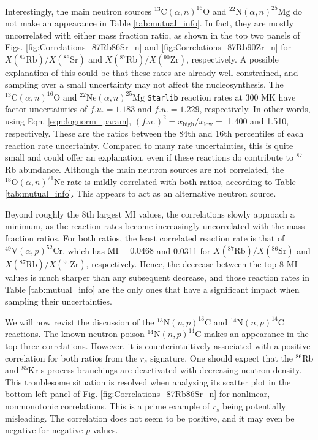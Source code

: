 Interestingly, the main neutron sources $^{13}\mathrm{C}(\alpha,n)^{16}\mathrm{O}$ and $^{22}\mathrm{N}(\alpha,n)^{25}\mathrm{Mg}$ do not make an appearance in Table \ref{tab:mutual_info}. In fact, they are mostly uncorrelated with either mass fraction ratio, as shown in the top two panels of Figs. \ref{fig:Correlations_87Rb86Sr_n} and \ref{fig:Correlations_87Rb90Zr_n} for $X(^{87}\mathrm{Rb})/X(^{86}\mathrm{Sr})$ and $X(^{87}\mathrm{Rb})/X(^{90}\mathrm{Zr})$, respectively. A possible explanation of this could be that these rates are already well-constrained, and sampling over a small uncertainty may not affect the nucleosynthesis. The $^{13}\mathrm{C}(\alpha,n)^{16}\mathrm{O}$ and $^{22}\mathrm{Ne}(\alpha,n)^{25}\mathrm{Mg}$ \texttt{Starlib} reaction rates at 300 MK have factor uncertainties of $f.u. = 1.183$ and $f.u. = 1.229$, respectively. In other words, using Eqn. \ref{eqn:lognorm_param}, $(f.u.)^{2} = x_{\mathrm{high}}/x_{\mathrm{low}} =$ 1.400 and 1.510, respectively. These are the ratios between the 84th and 16th percentiles of each reaction rate uncertainty. Compared to many rate uncertainties, this is quite small and could offer an explanation, even if these reactions do contribute to $^{87}$Rb abundance. Although the main neutron sources are not correlated, the $^{18}\mathrm{O}(\alpha,n)^{21}\mathrm{Ne}$ rate is mildly correlated with both ratios, according to Table \ref{tab:mutual_info}. This appears to act as an alternative neutron source.

Beyond roughly the 8th largest MI values, the correlations slowly approach a minimum, as the reaction rates become increasingly uncorrelated with the mass fraction ratios. For both ratios, the least correlated reaction rate is that of $^{49}\mathrm{V}(\alpha,p)^{52}\mathrm{Cr}$, which has $\mathrm{MI} = 0.0468$ and 0.0311 for $X(^{87}\mathrm{Rb})/X(^{86}\mathrm{Sr})$ and $X(^{87}\mathrm{Rb})/X(^{90}\mathrm{Zr})$, respectively. Hence, the decrease between the top 8 MI values is much sharper than any subsequent decrease, and those reaction rates in Table \ref{tab:mutual_info} are the only ones that have a significant impact when sampling their uncertainties.

We will now revist the discussion of the $^{13}\mathrm{N}(n,p)^{13}\mathrm{C}$ and $^{14}\mathrm{N}(n,p)^{14}\mathrm{C}$ reactions. The known neutron poison $^{14}\mathrm{N}(n,p)^{14}\mathrm{C}$ makes an appearance in the top three correlations. However, it is counterintuitively associated with a positive correlation for both ratios from the $r_{s}$ signature. One should expect that the $^{86}$Rb and $^{85}$Kr s-process branchings are deactivated with decreasing neutron density. This troublesome situation is resolved when analyzing its scatter plot in the bottom left panel of Fig. \ref{fig:Correlations_87Rb86Sr_n} for nonlinear, nonmonotonic correlations. This is a prime example of $r_{s}$ being potentially misleading. The correlation does not seem to be positive, and it may even be negative for negative $p$-values.

